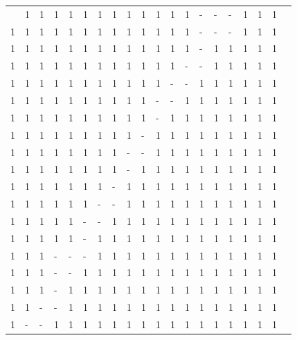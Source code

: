 \documentclass[10pt]{article}
\begin{document}
\begin{center}
\begin{tabular}{llllllllllllllllllll}
\hline
 & 1 & 1 & 1 & 1 & 1 & 1 & 1 & 1 & 1 & 1 & 1 & 1 & - & - & - & 1 & 1 & 1 \\
1 & 1 & 1 & 1 & 1 & 1 & 1 & 1 & 1 & 1 & 1 & 1 & 1 & - & - & - & 1 & 1 & 1 \\
1 & 1 & 1 & 1 & 1 & 1 & 1 & 1 & 1 & 1 & 1 & 1 & 1 & - & 1 & 1 & 1 & 1 & 1 \\
1 & 1 & 1 & 1 & 1 & 1 & 1 & 1 & 1 & 1 & 1 & 1 & - & - & 1 & 1 & 1 & 1 & 1 \\
1 & 1 & 1 & 1 & 1 & 1 & 1 & 1 & 1 & 1 & 1 & - & - & 1 & 1 & 1 & 1 & 1 & 1 \\
1 & 1 & 1 & 1 & 1 & 1 & 1 & 1 & 1 & 1 & - & - & 1 & 1 & 1 & 1 & 1 & 1 & 1 \\
1 & 1 & 1 & 1 & 1 & 1 & 1 & 1 & 1 & 1 & - & 1 & 1 & 1 & 1 & 1 & 1 & 1 & 1 \\
1 & 1 & 1 & 1 & 1 & 1 & 1 & 1 & 1 & - & 1 & 1 & 1 & 1 & 1 & 1 & 1 & 1 & 1 \\
1 & 1 & 1 & 1 & 1 & 1 & 1 & 1 & - & - & 1 & 1 & 1 & 1 & 1 & 1 & 1 & 1 & 1 \\
1 & 1 & 1 & 1 & 1 & 1 & 1 & 1 & - & 1 & 1 & 1 & 1 & 1 & 1 & 1 & 1 & 1 & 1 \\
1 & 1 & 1 & 1 & 1 & 1 & 1 & - & 1 & 1 & 1 & 1 & 1 & 1 & 1 & 1 & 1 & 1 & 1 \\
1 & 1 & 1 & 1 & 1 & 1 & - & - & 1 & 1 & 1 & 1 & 1 & 1 & 1 & 1 & 1 & 1 & 1 \\
1 & 1 & 1 & 1 & 1 & - & - & 1 & 1 & 1 & 1 & 1 & 1 & 1 & 1 & 1 & 1 & 1 & 1 \\
1 & 1 & 1 & 1 & 1 & - & 1 & 1 & 1 & 1 & 1 & 1 & 1 & 1 & 1 & 1 & 1 & 1 & 1 \\
1 & 1 & 1 & - & - & - & 1 & 1 & 1 & 1 & 1 & 1 & 1 & 1 & 1 & 1 & 1 & 1 & 1 \\
1 & 1 & 1 & - & - & 1 & 1 & 1 & 1 & 1 & 1 & 1 & 1 & 1 & 1 & 1 & 1 & 1 & 1 \\
1 & 1 & 1 & - & 1 & 1 & 1 & 1 & 1 & 1 & 1 & 1 & 1 & 1 & 1 & 1 & 1 & 1 & 1 \\
1 & 1 & - & - & 1 & 1 & 1 & 1 & 1 & 1 & 1 & 1 & 1 & 1 & 1 & 1 & 1 & 1 & 1 \\
1 & - & - & 1 & 1 & 1 & 1 & 1 & 1 & 1 & 1 & 1 & 1 & 1 & 1 & 1 & 1 & 1 & 1 \\
\hline
\end{tabular}
\end{center}
\end{document}

